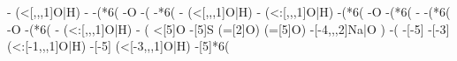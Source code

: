 \begin{struct}
{                                                  -
                                                    (<[,,,1]\textcolor{O}{O}|\textcolor{O}{H})
                                                  -
                                                  -(*6(
                                                    -\textcolor{O}{O}
                                                    -(
                                                      -*6(
                                                        -
                                                          (<[,,,1]\textcolor{O}{O}|\textcolor{O}{H})
                                                        -
                                                          (<:[,,,1]\textcolor{O}{O}|\textcolor{O}{H})
                                                        -(*6(
                                                          -\textcolor{O}{O}
                                                          -(*6(
                                                            -
                                                            -(*6(
                                                              -\textcolor{O}{O}
                                                              -(*6(
                                                                -
                                                                  (<:[,,,1]\textcolor{O}{O}|\textcolor{O}{H})
                                                                -
                                                                  (
                                                                    <[5]\textcolor{O}{O}
                                                                    -[5]\textcolor{S}{S}
                                                                      (=[2]\textcolor{O}{O})
                                                                      (=[5]\textcolor{O}{O})
                                                                    -[-4,,,2]Na|\textcolor{O}{O}
                                                                  )
                                                                -(
                                                                  -[-5]
                                                                  -[-3]
                                                                    (<:[-1,,,1]\textcolor{O}{O}|\textcolor{O}{H})
                                                                  -[-5]
                                                                    (<[-3,,,1]\textcolor{O}{O}|\textcolor{O}{H})
                                                                  -[5]*6(
}
\end{struct}
